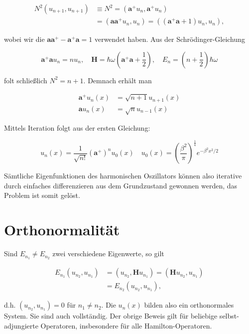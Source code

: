 \documentclass[10pt, letterpaper]{article}
\begin{document}
$$
\begin{aligned}
N^{2}\left(u_{n+1}, u_{n+1}\right) & \equiv N^{2}=\left(\mathbf{a}^{+} u_{n}, \mathbf{a}^{+} u_{n}\right) \\
& =\left(\mathbf{a} \mathbf{a}^{+} u_{n}, u_{n}\right)=\left(\left(\mathbf{a}^{+} \mathbf{a}+1\right) u_{n}, u_{n}\right),
\end{aligned}
$$

wobei wir die $\mathbf{a} \mathbf{a}^{+}-\mathbf{a}^{+} \mathbf{a}=1$ verwendet haben. Aus der Schrödinger-Gleichung

$$
\mathbf{a}^{+} \mathbf{a} u_{n}=n u_{n}, \quad \mathbf{H}=\hbar \omega\left(\mathbf{a}^{+} \mathbf{a}+\frac{1}{2}\right), \quad E_{n}=\left(n+\frac{1}{2}\right) \hbar \omega
$$

folt schließlich $N^{2}=n+1$. Demnach erhält man

$$
\begin{aligned}
\mathbf{a}^{+} u_{n}(x) & =\sqrt{n+1} u_{n+1}(x) \\
\mathbf{a} u_{n}(x) & =\sqrt{n} u_{n-1}(x)
\end{aligned}
$$

Mittels Iteration folgt aus der ersten Gleichung:

$$
u_{n}(x)=\frac{1}{\sqrt{n!}}\left(\mathbf{a}^{+}\right)^{n} u_{0}(x) \quad u_{0}(x)=\left(\frac{\beta^{2}}{\pi}\right)^{\frac{1}{4}} e^{-\beta^{2} x^{2} / 2}
$$

Sämtliche Eigenfunktionen des harmonischen Oszillators können also iterative durch einfaches differenzieren aus dem Grundzustand gewonnen werden, das Problem ist somit gelöst.

\section*{Orthonormalität}
Sind $E_{n_{1}} \neq E_{n_{2}}$ zwei verschiedene Eigenwerte, so gilt

$$
\begin{aligned}
E_{n_{1}}\left(u_{n_{2}}, u_{n_{1}}\right) & =\left(u_{n_{2}}, \mathbf{H} u_{n_{1}}\right)=\left(\mathbf{H} u_{n_{2}}, u_{n_{1}}\right) \\
& =E_{n_{2}}\left(u_{n_{2}}, u_{n_{1}}\right),
\end{aligned}
$$

d.h. $\left(u_{n_{2}}, u_{n_{1}}\right)=0$ für $n_{1} \neq n_{2}$. Die $u_{n}(x)$ bilden also ein orthonormales System. Sie sind auch vollständig. Der obrige Beweis gilt für beliebige selbst-adjungierte Operatoren, insbesondere für alle Hamilton-Operatoren.
\end{document}
